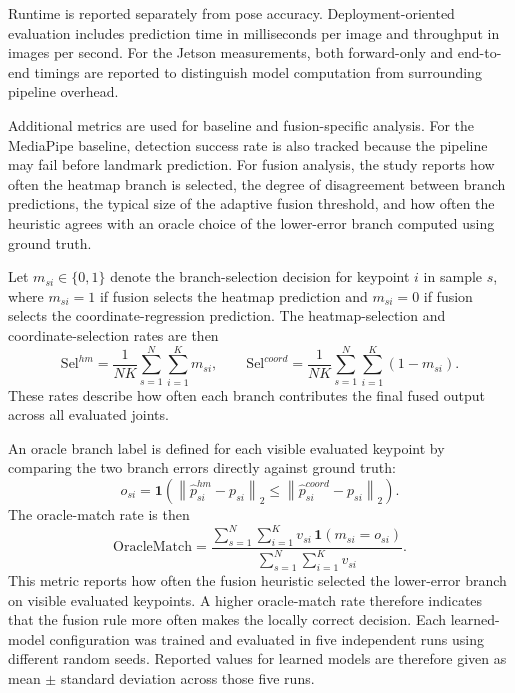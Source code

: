 \documentclass[10pt,letterpaper]{article}
\begin{document}
\medskip
\noindent
Runtime is reported separately from pose accuracy. Deployment-oriented evaluation includes prediction time in milliseconds per image and throughput in images per second. For the Jetson measurements, both forward-only and end-to-end timings are reported to distinguish model computation from surrounding pipeline overhead.

\medskip
\noindent
Additional metrics are used for baseline and fusion-specific analysis. For the MediaPipe baseline, detection success rate is also tracked because the pipeline may fail before landmark prediction. For fusion analysis, the study reports how often the heatmap branch is selected, the degree of disagreement between branch predictions, the typical size of the adaptive fusion threshold, and how often the heuristic agrees with an oracle choice of the lower-error branch computed using ground truth.

Let \(m_{si} \in \{0,1\}\) denote the branch-selection decision for keypoint \(i\) in sample \(s\), where \(m_{si}=1\) if fusion selects the heatmap prediction and \(m_{si}=0\) if fusion selects the coordinate-regression prediction. The heatmap-selection and coordinate-selection rates are then
\begin{equation}
\mathrm{Sel}^{hm} =
\frac{1}{NK}
\sum_{s=1}^{N}\sum_{i=1}^{K} m_{si},
\qquad
\mathrm{Sel}^{coord} =
\frac{1}{NK}
\sum_{s=1}^{N}\sum_{i=1}^{K} (1-m_{si}).
\label{eq:selection-rates}
\end{equation}
These rates describe how often each branch contributes the final fused output across all evaluated joints.

An oracle branch label is defined for each visible evaluated keypoint by comparing the two branch errors directly against ground truth:
\begin{equation}
o_{si} =
\mathbf{1}
\left(
\left\|
\hat{p}^{hm}_{si} - p_{si}
\right\|_2
\le
\left\|
\hat{p}^{coord}_{si} - p_{si}
\right\|_2
\right).
\label{eq:oracle-label}
\end{equation}
The oracle-match rate is then
\begin{equation}
\mathrm{OracleMatch} =
\frac{
\sum_{s=1}^{N}\sum_{i=1}^{K}
v_{si}\,\mathbf{1}(m_{si}=o_{si})
}{
\sum_{s=1}^{N}\sum_{i=1}^{K} v_{si}
}.
\label{eq:oracle-match}
\end{equation}
This metric reports how often the fusion heuristic selected the lower-error branch on visible evaluated keypoints. A higher oracle-match rate therefore indicates that the fusion rule more often makes the locally correct decision.
Each learned-model configuration was trained and evaluated in five independent runs using different random seeds. Reported values for learned models are therefore given as mean \(\pm\) standard deviation across those five runs.
\end{document}
